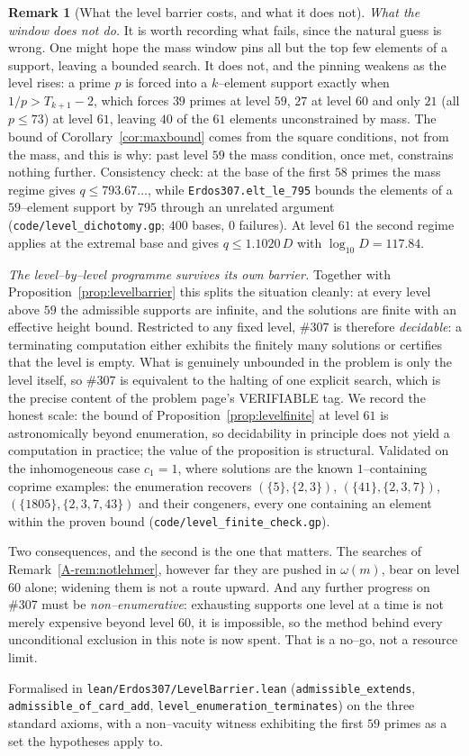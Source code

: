 \documentclass[11pt]{article}
\theoremstyle{definition}
\newtheorem{remark}[theorem]{Remark}
\begin{document}
\begin{remark}[What the level barrier costs, and what it does not]
\emph{What the window does not do.} It is worth recording what fails, since the natural guess is wrong. One might hope the mass window
pins all but the top few elements of a support, leaving a bounded search. It does not, and the
pinning weakens as the level rises: a prime $p$ is forced into a $k$--element support exactly when
$1/p>T_{k+1}-2$, which forces $39$ primes at level $59$, $27$ at level $60$ and only $21$
\textup{(}all $p\le73$\textup{)} at level $61$, leaving $40$ of the $61$ elements unconstrained by
mass. The bound of Corollary~\ref{cor:maxbound} comes from the square conditions, not from the mass,
and this is why: past level $59$ the mass condition, once met, constrains nothing further.
Consistency check: at the base of the first $58$ primes the mass regime gives $q\le793.67\ldots$,
while \texttt{Erdos307.elt\_le\_795} bounds the elements of a $59$--element support by $795$ through
an unrelated argument \textup{(\texttt{code/level\_dichotomy.gp}; $400$ bases, $0$ failures)}.
At level $61$ the second regime applies at the extremal base and gives $q\le1.1020\,D$ with
$\log_{10}D=117.84$.


\emph{The level--by--level programme survives its own barrier.} Together with Proposition~\ref{prop:levelbarrier} this splits the situation cleanly: at every level
above $59$ the admissible supports are infinite, and the solutions are finite with an effective
height bound. Restricted to any fixed level, \#307 is therefore \emph{decidable}: a terminating
computation either exhibits the finitely many solutions or certifies that the level is empty. What
is genuinely unbounded in the problem is only the level itself, so \#307 is equivalent to the
halting of one explicit search, which is the precise content of the problem page's
\textup{VERIFIABLE} tag. We record the honest scale: the bound of
Proposition~\ref{prop:levelfinite} at level $61$ is astronomically beyond enumeration, so
decidability in principle does not yield a computation in practice; the value of the proposition is
structural. Validated on the inhomogeneous case $c_1=1$, where solutions are the known
$1$--containing coprime examples: the enumeration recovers $(\{5\},\{2,3\})$,
$(\{41\},\{2,3,7\})$, $(\{1805\},\{2,3,7,43\})$ and their congeners, every one containing an
element within the proven bound \textup{(\texttt{code/level\_finite\_check.gp})}.


Two consequences, and the second is the one that matters. The searches of
Remark~\ref{A-rem:notlehmer}, however far they are pushed in $\omega(m)$, bear on level $60$ alone;
widening them is not a route upward. And any further progress on \#307 must be
\emph{non--enumerative}: exhausting supports one level at a time is not merely expensive beyond
level $60$, it is impossible, so the method behind every unconditional exclusion in this note is now
spent. That is a no--go, not a resource limit.

Formalised in \texttt{lean/Erdos307/LevelBarrier.lean} (\texttt{admissible\_extends},
\texttt{admissible\_of\_card\_add}, \texttt{level\_enumeration\_terminates}) on the three standard
axioms, with a non--vacuity witness exhibiting the first $59$ primes as a set the hypotheses apply
to.
\end{remark}
\end{document}
